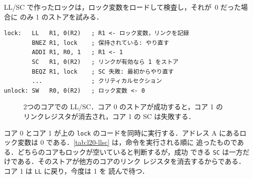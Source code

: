 \documentclass[../main.tex]{subfiles}
\begin{document}
LL/SC で作ったロックは，ロック変数をロードして検査し，それが~0 だった場合に
のみ 1 のストアを試みる．
\begin{lstlisting}[language={[x86masm]Assembler}, numbers=none, deletekeywords={lock}]
lock:   LL   R1, 0(R2)   ; R1 <- ロック変数，リンクを記録
        BNEZ R1, lock    ; 保持されている: やり直す
        ADDI R1, R0, 1   ; R1 <- 1
        SC   R1, 0(R2)   ; リンクが有効なら 1 をストア
        BEQZ R1, lock    ; SC 失敗: 最初からやり直す
        ...              ; クリティカルセクション
unlock: SW   R0, 0(R2)   ; ロック変数 <- 0
\end{lstlisting}
\begin{figure}[htbp]
  \centering
  
  \caption{2つのコアでの LL/SC．コア 0 のストアが成功すると，コア 1 の
    リンクレジスタが消去され，コア 1 の SC は失敗する．}
  \label{fig:l20-llsc}
\end{figure}


\begin{example}
  \label{ex:l20-llsc}
  コア 0 とコア 1 が上の \texttt{lock} のコードを同時に実行する．アドレス A
  にあるロック変数は 0 である．\cref{tab:l20-llsc} は，命令を実行される順に
  追ったものである．どちらのコアもロックが空いていると判断するが，成功
  できる \texttt{SC} は一方だけである．そのストアが他方のコアのリンク
  レジスタを消去するからである．コア 1 は \texttt{LL} に戻り，今度は 1 を
  読んで待つ．
\end{example}
\end{document}
